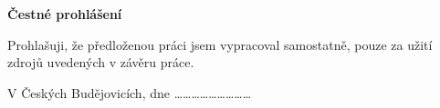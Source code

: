 \null
\thispagestyle{empty}
\textbf{Čestné prohlášení}

Prohlašuji, že předloženou práci jsem vypracoval samostatně,
pouze za užití zdrojů uvedených v závěru práce.

\begin{multicols}{2}
V Českých Budějovicích, dne 
\columnbreak
\flushright \ldots \ldots \ldots \ldots \ldots \ldots \ldots \ldots \ldots
\end{multicols}